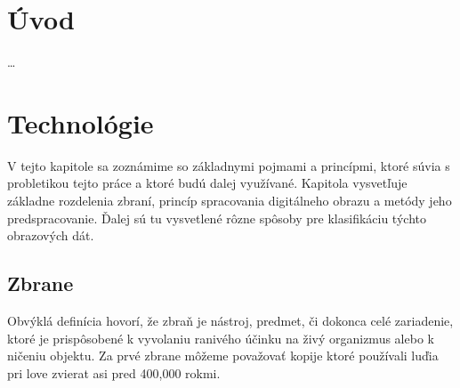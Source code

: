 
\chapter{Úvod}
\dots

\chapter{Technológie}
\label{chap:technologie}
V tejto kapitole sa zoznámime so základnymi pojmami a princípmi, ktoré súvia s probletikou tejto práce a ktoré budú dalej využívané.
Kapitola vysvetľuje základne rozdelenia zbraní, princíp spracovania digitálneho obrazu a metódy jeho predspracovanie.
Ďalej sú tu vysvetlené rôzne spôsoby pre klasifikáciu týchto obrazových dát.


\section{Zbrane}
Obvýklá definícia hovorí, že zbraň je nástroj, predmet, či dokonca celé zariadenie,
ktoré je prispôsobené k vyvolaniu ranivého účinku na živý organizmus alebo k ničeniu objektu\cite{book:StrelneZbrane}.
Za prvé zbrane môžeme považovať kopije ktoré používali luďia pri love zvierat asi pred 400,000 rokmi\cite{prop:SpearHistory}.

